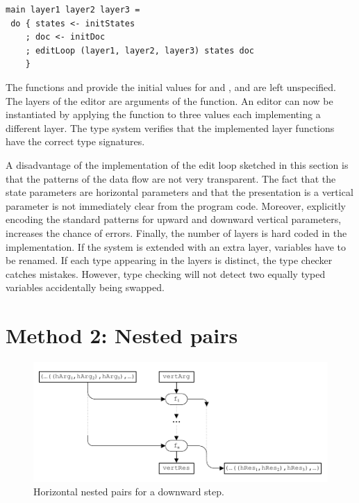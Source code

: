 \documentclass[preprint,natbib]{sigplanconf}
\begin{document}
\begin{small}
\begin{verbatim}
main layer1 layer2 layer3 = 
 do { states <- initStates
    ; doc <- initDoc 
    ; editLoop (layer1, layer2, layer3) states doc
    }
\end{verbatim}
\end{small}

The functions  and  provide the initial values for  and , and are left unspecified. The layers of the editor are arguments of the  function. An editor can now be instantiated by applying the function  to three  values each implementing a different layer. The type system verifies that the implemented layer functions have the correct type signatures.

A disadvantage of the implementation of the edit loop sketched in this section is that the patterns of the data flow are not very transparent. The fact that the state parameters are horizontal parameters and that the presentation is a vertical parameter is not immediately clear from the program code. Moreover, explicitly encoding the standard patterns for upward and downward vertical parameters, increases the chance of errors. Finally, the number of layers is hard coded in the implementation. If the system is extended with an extra layer, variables have to be renamed. If each type appearing in the layers is distinct, the type checker catches mistakes. However, type checking will not detect two equally typed variables accidentally being swapped.


%																
%																
%																
\section{Method 2: Nested pairs}\label{sect:ncp}

\begin{figure}
\includegraphics[width=\columnwidth]{images/NestedPairs}
\caption{Horizontal nested pairs for a downward step.}\label{ncp} 
\end{figure}
\end{document}

